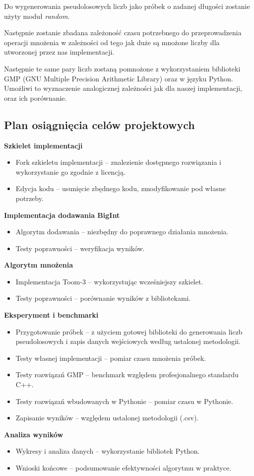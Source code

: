 \documentclass{article}
\begin{document}
Do wygenerowania pseudolosowych liczb jako próbek o zadanej długości zostanie użyty moduł \textit{random}.

Następnie zostanie zbadana zależoność czasu potrzebnego do przeprowadzenia operacji mnożenia w zależności od tego jak duże są mnożone liczby dla utworzonej przez nas implementacji.

Następnie te same pary liczb zostaną pomnożone z wykorzystaniem biblioteki GMP (GNU Multiple Precision Arithmetic Library) oraz w języku Python. Umożliwi to wyznaczenie analogicznej zależności jak dla naszej implementacji, oraz ich porównanie.

\subsection{Plan osiągnięcia celów projektowych}
\bigskip
\noindent \textbf{Szkielet implementacji}

\begin{itemize}
    \item Fork szkieletu implementacji -- znalezienie dostępnego rozwiązania i wykorzystanie go zgodnie z licencją.
    \item Edycja kodu -- usunięcie zbędnego kodu, zmodyfikowanie pod własne potrzeby.
\end{itemize}

\bigskip
\noindent \textbf{Implementacja dodawania BigInt}

\begin{itemize}
    \item Algorytm dodawania -- niezbędny do poprawnego działania mnożenia.
    \item Testy poprawności -- weryfikacja wyników.
\end{itemize}

\bigskip
\noindent\textbf{Algorytm mnożenia}

\begin{itemize}
    \item Implementacja Toom-3 -- wykorzystując wcześniejszy szkielet.
    \item Testy poprawności -- porównanie wyników z bibliotekami.
\end{itemize}

\bigskip
\noindent\textbf{Eksperyment i benchmarki}

\begin{itemize}
    \item Przygotowanie próbek -- z użyciem gotowej biblioteki do generowania liczb pseudolosowych i zapis danych wejściowych według ustalonej metodologii.
    \item Testy własnej implementacji -- pomiar czasu mnożenia próbek.
    \item Testy rozwiązań GMP -- benchmark względem profesjonalnego standardu C++.
    \item Testy rozwiązań wbudowanych w Pythonie -- pomiar czasu w Pythonie.
    \item Zapisanie wyników -- względem ustalonej metodologii (.csv).
\end{itemize}

\bigskip
\noindent\textbf{Analiza wyników}

\begin{itemize}
    \item Wykresy i analiza danych -- wykorzystanie bibliotek Python.
    \item Wnioski końcowe -- podsumowanie efektywności algorytmu w praktyce.
\end{itemize}

\newpage

\end{document}
